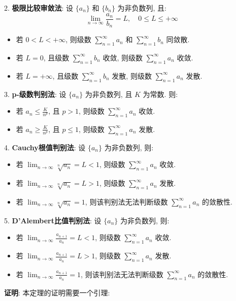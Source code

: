 \documentclass[a4paper,12pt]{ctexart}
\begin{document}
2. \textbf{极限比较审敛法}: 设 $\{a_n\}$ 和 $\{b_n\}$ 为非负数列, 且:
   $$
   \lim_{n \to \infty} \frac{a_n}{b_n} = L, \quad 0 \leq L \leq +\infty
   $$
   \begin{itemize}
       \item 若 $0 < L < +\infty$, 则级数 $\sum_{n=1}^{\infty} a_n$ 和 $\sum_{n=1}^{\infty} b_n$ 同敛散.
       \item 若 $L = 0$, 且级数 $\sum_{n=1}^{\infty} b_n$ 收敛, 则级数 $\sum_{n=1}^{\infty} a_n$ 收敛.
       \item 若 $L = +\infty$, 且级数 $\sum_{n=1}^{\infty} b_n$ 发散, 则级数 $\sum_{n=1}^{\infty} a_n$ 发散.
   \end{itemize}

3. \textbf{p-级数判别法}: 设 $\{a_n\}$ 为非负数列, 且 $K$ 为常数. 则:
   \begin{itemize}
       \item 若 $a_n \leq \frac{K}{n^p}$, 且 $p>1$, 则级数 $\sum_{n=1}^{\infty} a_n$ 收敛.
       \item 若 $a_n \geq \frac{K}{n^p}$, 且 $p \leq 1$, 则级数 $\sum_{n=1}^{\infty} a_n$ 发散.
   \end{itemize}

4. \textbf{Cauchy根值判别法}: 设 $\{a_n\}$ 为非负数列, 则:
   \begin{itemize}
       \item 若 $\lim_{n \to \infty} \sqrt[n]{a_n} = L < 1$, 则级数 $\sum_{n=1}^{\infty} a_n$ 收敛.
       \item 若 $\lim_{n \to \infty} \sqrt[n]{a_n} = L > 1$, 则级数 $\sum_{n=1}^{\infty} a_n$ 发散.
       \item 若 $\lim_{n \to \infty} \sqrt[n]{a_n} = 1$, 则该判别法无法判断级数 $\sum_{n=1}^{\infty} a_n$ 的敛散性.
   \end{itemize}

5. \textbf{D'Alembert比值判别法}: 设 $\{a_n\}$ 为非负数列, 则:
   \begin{itemize}
       \item 若 $\lim_{n \to \infty} \frac{a_{n+1}}{a_n} = L < 1$, 则级数 $\sum_{n=1}^{\infty} a_n$ 收敛.
       \item 若 $\lim_{n \to \infty} \frac{a_{n+1}}{a_n} = L > 1$, 则级数 $\sum_{n=1}^{\infty} a_n$ 发散.
       \item 若 $\lim_{n \to \infty} \frac{a_{n+1}}{a_n} = 1$, 则该判别法无法判断级数 $\sum_{n=1}^{\infty} a_n$ 的敛散性.
   \end{itemize}

\textbf{证明}: 本定理的证明需要一个引理:
\end{document}
